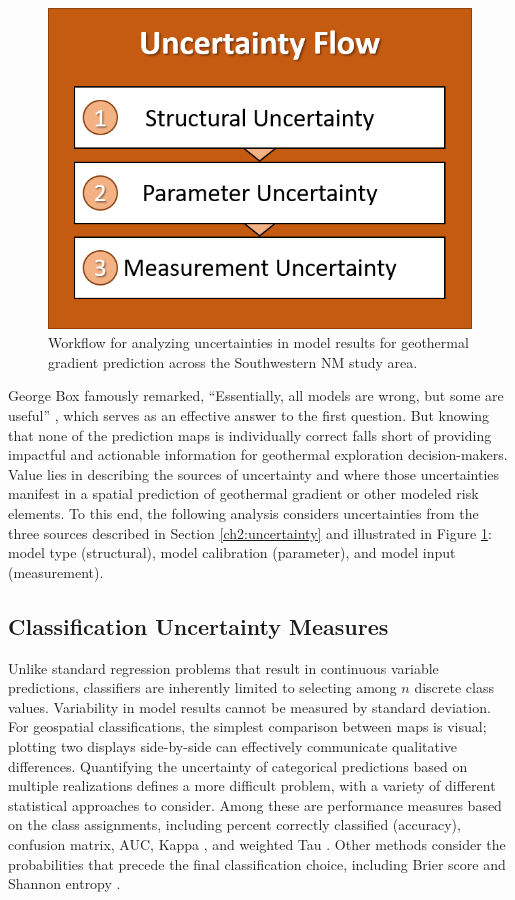 \begin{figure}[!htp]
\centering
\includegraphics[width=.35\linewidth]{templates/images/Flow-Uncertainty.png}
\singlespacing
\caption[Uncertainty analysis workflow]{Workflow for analyzing uncertainties in model results for geothermal gradient prediction across the Southwestern NM study area.}
\label{fig:uncertainty_flow}
\end{figure}

George Box famously remarked, ``Essentially, all models are wrong, but some are useful'' \citep{box_empirical_1987}, which serves as an effective answer to the first question. But knowing that none of the prediction maps is individually correct falls short of providing impactful and actionable information for geothermal exploration decision-makers. Value lies in describing the sources of uncertainty and where those uncertainties manifest in a spatial prediction of geothermal gradient or other modeled risk elements. To this end, the following analysis considers uncertainties from the three sources described in Section \ref{ch2:uncertainty} and illustrated in Figure \ref{fig:uncertainty_flow}: model type (structural), model calibration (parameter), and model input (measurement).

\subsection{Classification Uncertainty Measures}\label{ch3:uncertainty_measures}
Unlike standard regression problems that result in continuous variable predictions, classifiers are inherently limited to selecting among $n$ discrete class values. Variability in model results cannot be measured by standard deviation. For geospatial classifications, the simplest comparison between maps is visual; plotting two displays side-by-side can effectively communicate qualitative differences. Quantifying the uncertainty of categorical predictions based on multiple realizations defines a more difficult problem, with a variety of different statistical approaches to consider. Among these are performance measures based on the class assignments, including percent correctly classified (accuracy), confusion matrix, AUC, Kappa \citep{cohen_coefficient_1960}, and weighted Tau \citep{ma_tau_1995}. Other methods consider the probabilities that precede the final classification choice, including Brier score \citep{brier_verification_1950} and Shannon entropy \citep{shannon_mathematical_1948}.

